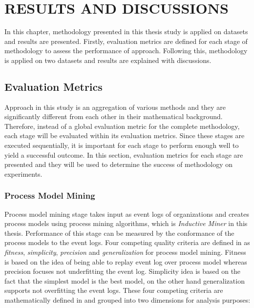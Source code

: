 \chapter{RESULTS AND DISCUSSIONS} 
\label{chp:results-and-discussions}

In this chapter, methodology presented in this thesis study is applied on datasets and results are presented. Firstly, evaluation metrics are defined for each stage of methodology to assess the performance of approach. Following this, methodology is applied on two datasets and results are explained with discussions.

\section{Evaluation Metrics}
\label{sec:evaluation-metrics}
Approach in this study is an aggregation of various methods and they are significantly different from each other in their mathematical background. Therefore, instead of a global evaluation metric for the complete methodology, each stage will be evaluated within its evaluation metrics. Since these stages are executed sequentially, it is important for each stage to perform enough well to yield a successful outcome. In this section, evaluation metrics for each stage are presented and they will be used to determine the success of methodology on experiments.

\subsection{Process Model Mining}
\label{subsec:process-model-mining-eval}
Process model mining stage takes input as event logs of organizations and creates process models using process mining algorithms, which is \textit{Inductive Miner}\cite{leemans2014discoveringinfrequent} in this thesis. Performance of this stage can be measured by the conformance of the process models to the event logs. Four competing quality criteria are defined in \cite{van2011process} as \textit{fitness}, \textit{simplicity}, \textit{precision} and \textit{generalization} for process model mining. Fitness is based on the idea of being able to replay event log over process model whereas precision focuses not underfitting the event log. Simplicity idea is based on the fact that the simplest model is the best model, on the other hand generalization supports not overfitting the event logs. These four competing criteria are mathematically defined in \cite{rozinat2008conformance} and grouped into two dimensions for analysis purposes:

